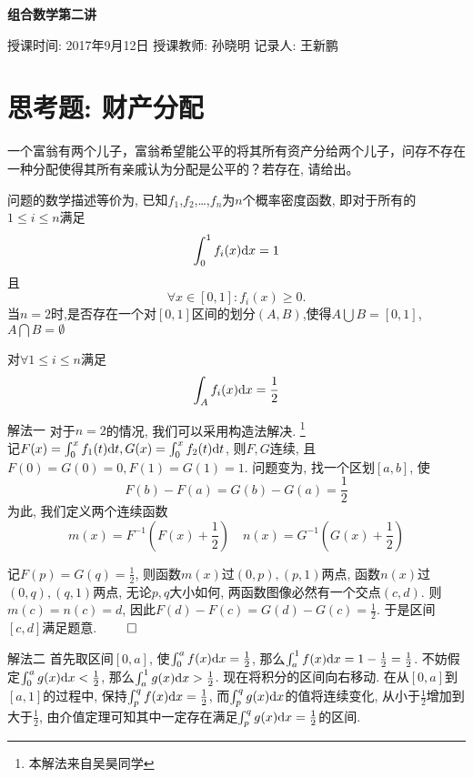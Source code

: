 \documentclass[11pt]{article}%
\begin{document}
    \pagestyle{fancy}
    \chead{}
    \begin{center}
        {\LARGE \bf 组合数学第二讲}\\
    \end{center}
        \begin{kaishu}
            授课时间: 2017年9月12日\quad
            授课教师: 孙晓明
            \hfill 记录人: 王新鹏
        \end{kaishu}

    \section{思考题: 财产分配}
    一个富翁有两个儿子，富翁希望能公平的将其所有资产分给两个儿子，问存不存在一种分配使得其所有亲戚认为分配是公平的？若存在, 请给出。

    问题的数学描述等价为, 已知$f_1$,$f_2$,\dots,$f_n$为$n$个概率密度函数, 即对于所有的$1\le i\le n$满足
    \[
        \int_0^1 f_i(x) {\rm d}x=1
    \]
    且
    \[
        \forall x\in [0,1]: f_i(x) \ge 0.
    \]
    当$n = 2$时,是否存在一个对$[0, 1]$区间的划分$(A, B)$,使得$A\bigcup B= [0, 1]$, $A\bigcap B =\emptyset$

    对$\forall 1\le i\le n$满足
    \[
        \int_A f_i(x) {\rm d}x=\frac{1}{2}
    \]

    $\textbf{解法一}$
        \quad 对于$n=2$的情况, 我们可以采用构造法解决. \footnote{本解法来自吴昊同学}\\
        记$F(x)=\int_0^x f_1(t) {\rm d}t, G(x)=\int_0^x f_2(t) {\rm d}t$, 则$F,G$连续, 且$F(0)=G(0)=0,F(1)=G(1)=1$. 问题变为, 找一个区划$[a,b]$, 使
        \[
            F(b)-F(a)=G(b)-G(a)=\frac{1}{2}
        \]
        为此, 我们定义两个连续函数
        \[
            m(x)=F^{-1}(F(x)+\frac{1}{2})\quad
            n(x)=G^{-1}(G(x)+\frac{1}{2})
        \]

        记$F(p)=G(q)=\frac{1}{2}$, 则函数$m(x)$过$(0,p),(p,1)$两点, 函数$n(x)$过$(0,q),(q,1)$两点, 无论$p,q$大小如何, 两函数图像必然有一个交点$(c,d)$. 则$m(c)=n(c)=d$, 因此$F(d)-F(c)=G(d)-G(c)=\frac{1}{2}$. 于是区间$[c,d]$满足题意. \hfill$\qed$
    \vspace{1em}

    $\textbf{解法二}$
        \quad 首先取区间$[0,a]$, 使$\int_0^a f(x) {\rm d}x=\frac{1}{2}$, 那么$\int_a^1 f(x) {\rm d}x=1 - \frac{1}{2} = \frac{1}{2}$. 不妨假定$\int_0^a g(x) {\rm d}x <\frac{1}{2}$, 那么$\int_a^1 g(x) {\rm d}x >\frac{1}{2}$. 现在将积分的区间向右移动. 在从$[0,a]$到$[a,1]$的过程中, 保持$\int_p^q f(x) {\rm d}x = \frac{1}{2}$, 而$\int_p^q g(x) {\rm d}x$的值将连续变化, 从小于$\frac{1}{2}$增加到大于$\frac{1}{2}$, 由介值定理可知其中一定存在满足$\int_p^q g(x) {\rm d}x =\frac{1}{2}$的区间.
\end{document}
